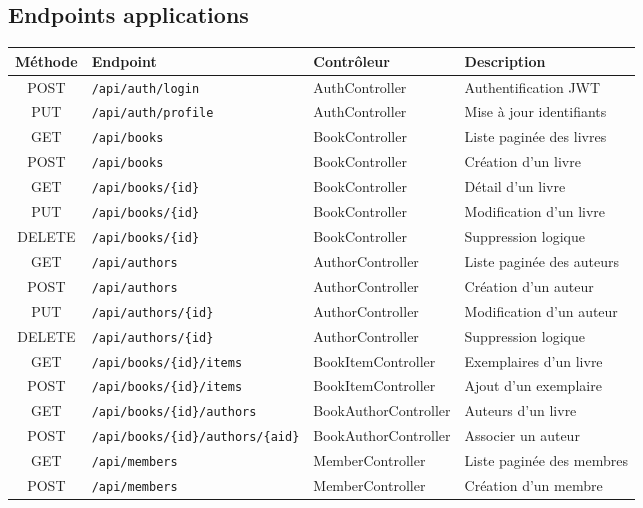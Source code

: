 \documentclass[12pt,a4paper]{article}
\newcommand{\tableheader}[1]{%
  \cellcolor{navy}\color{white}\bfseries #1%
}
\begin{document}
\subsection{Endpoints applications}
\begin{center}
\small
\begin{longtable}{|c|p{3.2cm}|p{2.8cm}|p{5cm}|}
\hline
\tableheader{M\'ethode} & \tableheader{Endpoint} & \tableheader{Contr\^oleur} & \tableheader{Description} \\
\hline
\endhead
POST & \texttt{/api/auth/login} & AuthController & Authentification JWT \\
PUT & \texttt{/api/auth/profile} & AuthController & Mise \`a jour identifiants \\
GET & \texttt{/api/books} & BookController & Liste pagin\'ee des livres \\
POST & \texttt{/api/books} & BookController & Cr\'eation d'un livre \\
GET & \texttt{/api/books/\{id\}} & BookController & D\'etail d'un livre \\
PUT & \texttt{/api/books/\{id\}} & BookController & Modification d'un livre \\
DELETE & \texttt{/api/books/\{id\}} & BookController & Suppression logique \\
GET & \texttt{/api/authors} & AuthorController & Liste pagin\'ee des auteurs \\
POST & \texttt{/api/authors} & AuthorController & Cr\'eation d'un auteur \\
PUT & \texttt{/api/authors/\{id\}} & AuthorController & Modification d'un auteur \\
DELETE & \texttt{/api/authors/\{id\}} & AuthorController & Suppression logique \\
GET & \texttt{/api/books/\{id\}/items} & BookItemController & Exemplaires d'un livre \\
POST & \texttt{/api/books/\{id\}/items} & BookItemController & Ajout d'un exemplaire \\
GET & \texttt{/api/books/\{id\}/authors} & BookAuthorController & Auteurs d'un livre \\
POST & \texttt{/api/books/\{id\}/authors/\{aid\}} & BookAuthorController & Associer un auteur \\
GET & \texttt{/api/members} & MemberController & Liste pagin\'ee des membres \\
POST & \texttt{/api/members} & MemberController & Cr\'eation d'un membre \\

\end{longtable}
\end{center}
\end{document}
